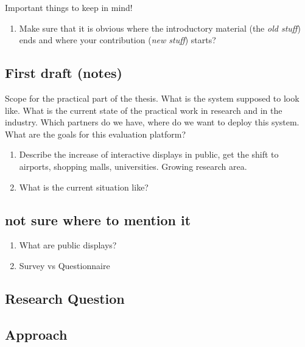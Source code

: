 Important things to keep in mind!

  \begin{enumerate}
  \item Make sure that it is obvious where the introductory material (the \textit{old stuff}) ends and where your contribution (\textit{new stuff}) starts?
  \end{enumerate}






\subsection{First draft (notes)}

	Scope for the practical part of the thesis. What is the system supposed to look like. What is the current state of the practical work in research and in the industry. Which partners do we have, where do we want to deploy this system. What are the goals for this evaluation platform?



	\begin{enumerate}
	\item Describe the increase of interactive displays in public, get the shift to airports, shopping malls, universities. Growing research area.
	
	\item What is the current situation like?
	\end{enumerate}





\subsection{not sure where to mention it}

	\begin{enumerate}
	\item What are public displays?
	\item Survey vs Questionnaire
	\end{enumerate}


	\subsection{Research Question}



	\subsection{Approach}



